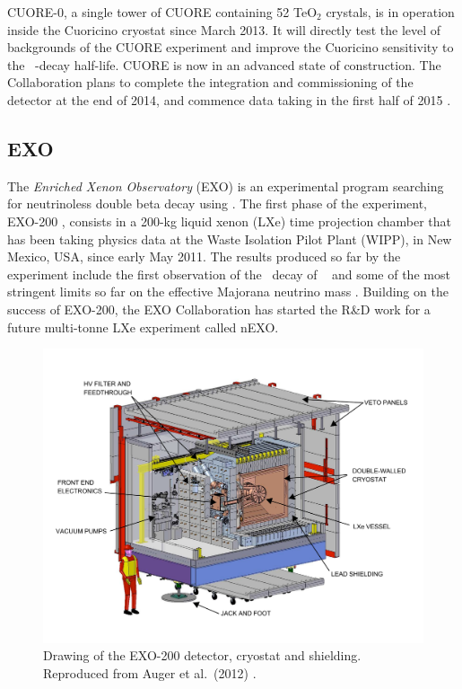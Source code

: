 \documentclass{PoS}
\begin{document}
CUORE-0, a single tower of CUORE containing 52 TeO$_{2}$ crystals, is in operation inside the Cuoricino cryostat since March 2013. It will directly test the level of backgrounds of the CUORE experiment and improve the Cuoricino sensitivity to the \TE\ \bbonu-decay half-life. CUORE is now in an advanced state of construction. The Collaboration plans to complete the integration and commissioning of the detector at the end of 2014, and commence data taking in the first half of 2015 \cite{Artusa:2014lgv}.


\subsection{EXO} \label{subsec:EXO}
The \emph{Enriched Xenon Observatory} (EXO) is an experimental program searching for neutrinoless double beta decay using \XE. The first phase of the experiment, EXO-200 \cite{Auger:2012gs}, consists in a 200-kg liquid xenon (LXe) time projection chamber that has been taking physics data at the Waste Isolation Pilot Plant (WIPP), in New Mexico, USA, since early May 2011. The results produced so far by the experiment include the first observation of the \bbtnu\ decay of \XE\ \cite{Albert:2013gpz} and some of the most stringent limits so far on the effective Majorana neutrino mass \cite{Albert:2014awa, Auger:2012ar}. Building on the success of EXO-200, the EXO Collaboration has started the R\&D work for a future multi-tonne LXe experiment called nEXO.  

\begin{figure}
\centering
\includegraphics[width=\textwidth]{img/EXO200Cleanroom.pdf}
\caption{Drawing of the EXO-200 detector, cryostat and shielding. Reproduced from Auger et al.\ (2012) \cite{Auger:2012gs}.} \label{fig:EXO200}
\end{figure}
\end{document}
